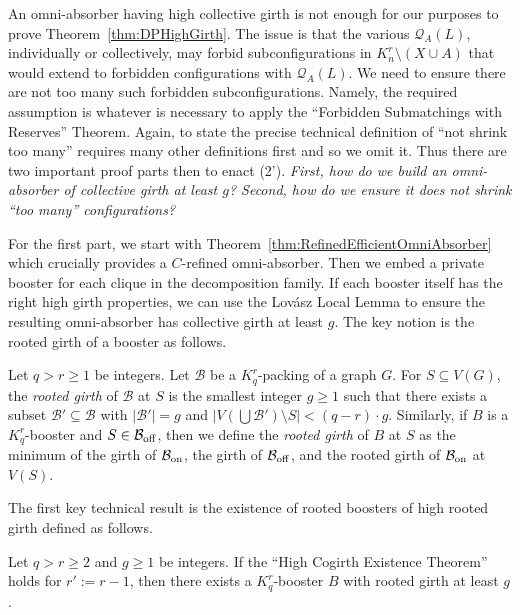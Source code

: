 \documentclass[twoside,leqno]{article}
\begin{document}
An omni-absorber having high collective girth is not enough for our purposes to prove Theorem~\ref{thm:DPHighGirth}. The issue is that the various $\mathcal{Q}_A(L)$, individually or collectively, may forbid subconfigurations in $K_n^r\setminus (X\cup A)$ that would extend to forbidden configurations with $\mathcal{Q}_A(L)$. We need to ensure there are not too many such forbidden subconfigurations. Namely, the required assumption is whatever is necessary to apply the ``Forbidden Submatchings with Reserves'' Theorem. Again, to state the precise technical definition of ``not shrink too many'' requires many other definitions first and so we omit it. Thus there are two important proof parts then to enact (2'). \emph{First, how do we build an omni-absorber of collective girth at least $g$? Second, how do we ensure it does not shrink ``too many'' configurations?}

For the first part, we start with Theorem~\ref{thm:RefinedEfficientOmniAbsorber} which crucially provides a $C$-refined omni-absorber. Then we embed a private booster for each clique in the decomposition family. If each booster itself has the right high girth properties, we can use the Lov\'asz Local Lemma to ensure the resulting omni-absorber has collective girth at least $g$. The key notion is the rooted girth of a booster as follows.

\begin{definition}
Let $q > r\ge 1$ be integers. Let $\mathcal{B}$ be a $K_q^r$-packing of a graph $G$. For $S\subseteq V(G)$, the \emph{rooted girth} of $\mathcal{B}$ at $S$ is the smallest integer $g\ge 1$ such that there exists a subset $\mathcal{B}'\subseteq \mathcal{B}$  with $|\mathcal{B}'|=g$ and $|V(\bigcup \mathcal{B}')\setminus S| < (q-r)\cdot g$. Similarly, if $B$ is a $K_q^r$-booster and $S\in \mathcal{B}_{\rm off}$, then we define the \emph{rooted girth} of $B$ at $S$ as the minimum of the girth of $\mathcal{B}_{{\rm on}}$, the girth of $\mathcal{B}_{{\rm off}}$, and the rooted girth of $\mathcal{B}_{{\rm on}}$ at $V(S)$.
\end{definition}

The first key technical result is the existence of rooted boosters of high rooted girth defined as follows.

\begin{thm}\label{thm:HighRootedGirthBooster}
Let $q > r\ge 2$ and $g\ge 1$ be integers. If the ``High Cogirth Existence Theorem'' holds for $r':=r-1$, then there exists a $K_q^r$-booster $B$ with rooted girth at least $g$. 
\end{thm}
\end{document}
